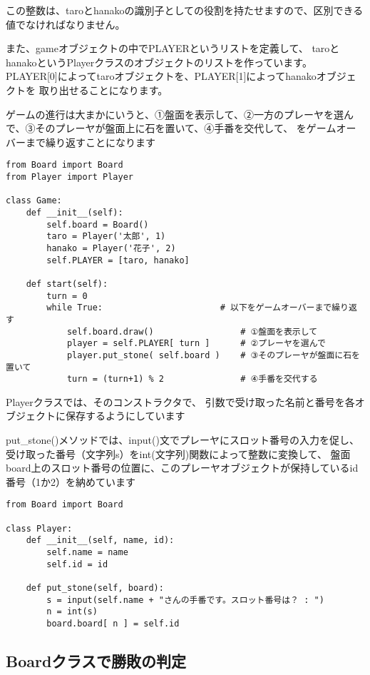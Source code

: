 \documentclass[uplatex,a4paper,11pt,oneside,openany]{jsbook}
\begin{document}
この整数は、taroとhanakoの識別子としての役割を持たせますので、区別できる値でなければなりません。

また、gameオブジェクトの中でPLAYERというリストを定義して、
taroとhanakoというPlayerクラスのオブジェクトのリストを作っています。
PLAYER[0]によってtaroオブジェクトを、PLAYER[1]によってhanakoオブジェクトを
取り出せることになります。

ゲームの進行は大まかにいうと、①盤面を表示して、②一方のプレーヤを選んで、③そのプレーヤが盤面上に石を置いて、④手番を交代して、
をゲームオーバーまで繰り返すことになります

\begin{lstlisting}[caption=class Game,label=prog03-1]
from Board import Board
from Player import Player

class Game:
    def __init__(self):
        self.board = Board()
        taro = Player('太郎', 1)
        hanako = Player('花子', 2)
        self.PLAYER = [taro, hanako]

    def start(self):
        turn = 0
        while True:                       # 以下をゲームオーバーまで繰り返す
            self.board.draw()                 # ①盤面を表示して
            player = self.PLAYER[ turn ]      # ②プレーヤを選んで
            player.put_stone( self.board )    # ③そのプレーヤが盤面に石を置いて
            turn = (turn+1) % 2               # ④手番を交代する
\end{lstlisting}%

Playerクラスでは、そのコンストラクタで、
引数で受け取った名前と番号を各オブジェクトに保存するようにしています

put\_stone()メソッドでは、input()文でプレーヤにスロット番号の入力を促し、
受け取った番号（文字列s）をint(文字列)関数によって整数に変換して、
盤面board上のスロット番号の位置に、このプレーヤオブジェクトが保持しているid番号（1か2）を納めています

\begin{lstlisting}[caption=class Player,label=prog03-2]
from Board import Board

class Player:
    def __init__(self, name, id):
        self.name = name
        self.id = id

    def put_stone(self, board):
        s = input(self.name + "さんの手番です。スロット番号は？ : ")
        n = int(s)
        board.board[ n ] = self.id
\end{lstlisting}%

\subsection{Boardクラスで勝敗の判定}
\end{document}
